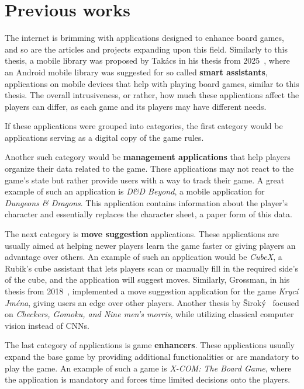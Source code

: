 \chapter{Previous works}
The internet is brimming with applications designed to enhance board games, and so are the articles and projects expanding upon this field. Similarly to this thesis, a mobile library was proposed by Takács in his thesis from 2025~\cite{takacs}, where an Android mobile library was suggested for so called \textbf{smart assistants}, applications on mobile devices that help with playing board games, similar to this thesis. The overall intrusiveness, or rather, how much these applications affect the players can differ, as each game and its players may have different needs.

If these applications were grouped into categories, the first category would be applications serving as a digital copy of the game rules.

Another such category would be \textbf{management applications} that help players organize their data related to the game. These applications may not react to the game's state but rather provide users with a way to track their game. A great example of such an application is \textit{D\&D Beyond}, a mobile application for \textit{Dungeons \& Dragons}. This application contains information about the player's character and essentially replaces the character sheet, a paper form of this data.

The next category is \textbf{move suggestion} applications. These applications are usually aimed at helping newer players learn the game faster or giving players an advantage over others. An example of such an application would be \textit{CubeX}, a Rubik's cube assistant that lets players scan or manually fill in the required side's of the cube, and the application will suggest moves. Similarly, Grossman, in his thesis from 2018~\cite{grossman}, implemented a move suggestion application for the game \textit{Krycí Jména}, giving users an edge over other players. Another thesis by Široký~\cite{siroky} focused on \textit{Checkers, Gomoku, and Nine men’s morris}, while utilizing classical computer vision instead of CNNs.

The last category of applications is game \textbf{enhancers}. These applications usually expand the base game by providing additional functionalities or are mandatory to play the game. An example of such a game is \textit{X-COM: The Board Game}, where the application is mandatory and forces time limited decisions onto the players.